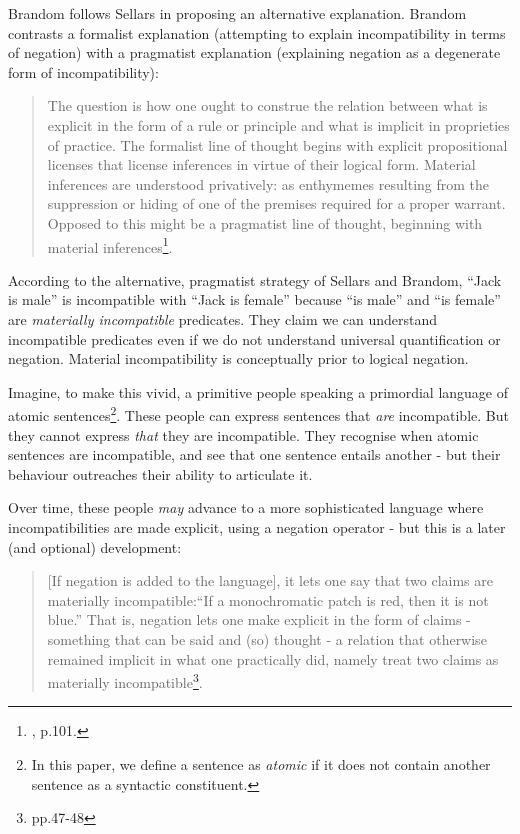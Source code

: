 Brandom \cite{brandom2} follows Sellars in proposing an alternative explanation.
Brandom contrasts a formalist explanation (attempting to explain incompatibility in terms of negation) with a pragmatist explanation (explaining negation as a degenerate form of incompatibility):
\begin{quote}
The question is how one ought to construe the relation between what is explicit in the form of a rule or principle and what is implicit in proprieties of practice. 
The formalist line of thought begins with explicit propositional licenses that license inferences in virtue of their logical form. Material inferences are understood privatively: as enthymemes resulting from the suppression or hiding of one of the premises required for a proper warrant. 
Opposed to this might be a pragmatist line of thought, beginning with material inferences\footnote{\cite{brandom2}, p.101.}.
\end{quote}
According to the alternative, pragmatist strategy of Sellars and Brandom, ``Jack
is male'' is incompatible with ``Jack is female'' because ``is male''
and ``is female'' are \emph{materially incompatible} predicates.  They
claim we can understand incompatible predicates even if we do
not understand universal quantification or negation.  
Material incompatibility is conceptually prior to logical negation.

Imagine, to make this vivid, a primitive people speaking a primordial
language of atomic sentences\footnote{In this paper, we define a sentence as \emph{atomic} if it does
  not contain another sentence as a syntactic constituent.}. These people can express sentences
that \emph{are} incompatible.  But they cannot express \emph{that}
they are incompatible.  They recognise when atomic sentences are
incompatible, and see that one sentence entails another - but their
behaviour outreaches their ability to articulate it.

Over time, these people \emph{may} advance to a more sophisticated
language where incompatibilities are made explicit, using a negation
operator - but this is a later (and optional) development:
\begin{quote}
[If negation is added to the language], it lets one say that two
claims are materially incompatible:``If a monochromatic patch is red,
then it is not blue.'' That is, negation lets one make explicit in the
form of claims - something that can be said and (so) thought - a
relation that otherwise remained implicit in what one practically did,
namely treat two claims as materially
incompatible\footnote{\cite{brandom} pp.47-48}.
\end{quote}

